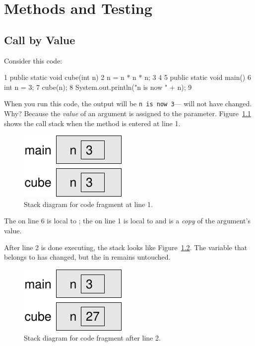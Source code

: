 \chapter{Methods and Testing}

\section{Call by Value}
\label{sec.call.by.value}
Consider this code:

\begin{code}
 1 public static void cube(int n) {
 2     n = n * n * n;
 3 }
 4
 5 public static void main() {
 6     int n = 3;
 7     cube(n);
 8     System.out.println("n is now " + n);
 9 }
\end{code}

When you run this code, the output will be \texttt{n is now 3}--- will not have changed. Why? Because the {\em value} of an argument is assigned to the parameter. Figure~\ref{fig.value1} shows the call stack when the  method is entered at line 1.

\begin{figure}[!ht]
\begin{center}
\includegraphics{figs/ch04/call_by_value1.pdf}
\caption{Stack diagram for code fragment at line 1.}
\label{fig.value1}
\end{center}
\end{figure}

The  on line 6 is local to ; the  on line 1 is local to  and is a {\em copy} of the argument's value.

After line 2 is done executing, the stack looks like Figure~\ref{fig.value2}.  The variable  that belongs to  has changed, but the  in  remains untouched.

\begin{figure}[!ht]
\begin{center}
\includegraphics{figs/ch04/call_by_value2.pdf}
\caption{Stack diagram for code fragment after line 2.}
\label{fig.value2}
\end{center}
\end{figure}

